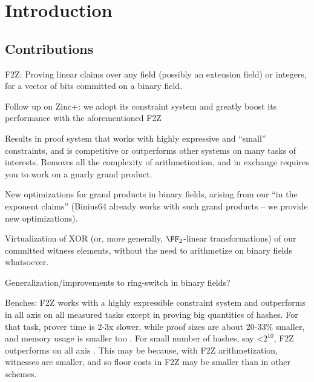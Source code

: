 \documentclass[11pt,letterpaper,usenames,dvipsnames]{article}
\title{\plaintitle}
\date{\today}
\begin{document}
\maketitle

\begin{abstract}
\end{abstract}

\setcounter{tocdepth}{3}

\tableofcontents


\section{Introduction}

\subsection{Contributions}

F2Z: Proving linear claims over any field (possibly an extension field) or integers, for a vector of bits committed on a binary field. 

Follow up  on Zinc+: we adopt its constraint system and greatly boost its performance with the aforementioned F2Z

Results in proof system that works with highly expressive and ``small'' constraints, and is competitive or outperforms other systems on many tasks of interests.  Removes all the complexity of arithmetization, and in exchange requires you to work on a gnarly grand product.

New optimizations for grand products in binary fields, arising from our ``in the exponent claims'' (Binius64 already works with such grand products -- we provide new optimizations).

Virtualization of XOR (or, more generally, $\FF_2$-linear transformations) of our committed witness elements, without the need to arithmetize on binary fields whatsoever.

Generalization/improvements to ring-switch in binary fields?

Benches: F2Z works with a highly expressible constraint system and outperforms in all axis on all measured tasks except in proving big quantities of hashes. For that task, prover time is 2-3x slower, while proof sizes are about 20-33\% smaller, and memory usage is smaller too . For small number of hashes, say <$2^{10}$, F2Z outperforms on all axis . This may be because, with F2Z arithmetization, witnesses are smaller, and so floor costs in F2Z may be smaller than in other schemes. 
\end{document}
